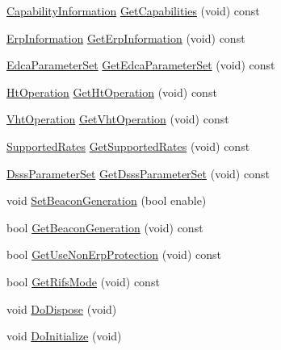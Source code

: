 \begin{DoxyCompactItemize}
\item 
\hyperlink{classns3_1_1CapabilityInformation}{Capability\+Information} \hyperlink{classns3_1_1ApWifiMac_a5794cfc6ec6c72f335b36f302a83178a}{Get\+Capabilities} (void) const 
\item 
\hyperlink{classns3_1_1ErpInformation}{Erp\+Information} \hyperlink{classns3_1_1ApWifiMac_ae88a116a1cdc0895105765b2c27e2f1a}{Get\+Erp\+Information} (void) const 
\item 
\hyperlink{classns3_1_1EdcaParameterSet}{Edca\+Parameter\+Set} \hyperlink{classns3_1_1ApWifiMac_a6b29faae7352877a1aa97a2146725ff5}{Get\+Edca\+Parameter\+Set} (void) const 
\item 
\hyperlink{classns3_1_1HtOperation}{Ht\+Operation} \hyperlink{classns3_1_1ApWifiMac_ae67f8b753332b379d189007ffee40733}{Get\+Ht\+Operation} (void) const 
\item 
\hyperlink{classns3_1_1VhtOperation}{Vht\+Operation} \hyperlink{classns3_1_1ApWifiMac_afde045b9f011d312e3110bb5b9411403}{Get\+Vht\+Operation} (void) const 
\item 
\hyperlink{classns3_1_1SupportedRates}{Supported\+Rates} \hyperlink{classns3_1_1ApWifiMac_a3d1278fa6624859d50b4ed984125de30}{Get\+Supported\+Rates} (void) const 
\item 
\hyperlink{classns3_1_1DsssParameterSet}{Dsss\+Parameter\+Set} \hyperlink{classns3_1_1ApWifiMac_a577723413f2a747d71ed01d8646ccc79}{Get\+Dsss\+Parameter\+Set} (void) const 
\item 
void \hyperlink{classns3_1_1ApWifiMac_a09ad3b96835cb8fac18783423d3e57a7}{Set\+Beacon\+Generation} (bool enable)
\item 
bool \hyperlink{classns3_1_1ApWifiMac_af6c5a1906e2bb39a655f92738efb9256}{Get\+Beacon\+Generation} (void) const 
\item 
bool \hyperlink{classns3_1_1ApWifiMac_a62eda2e1029d7922c4ed5bb5b0925d13}{Get\+Use\+Non\+Erp\+Protection} (void) const 
\item 
bool \hyperlink{classns3_1_1ApWifiMac_adafdc3775cb9facdd312947c854bbd81}{Get\+Rifs\+Mode} (void) const 
\item 
void \hyperlink{classns3_1_1ApWifiMac_a6a889756f44c64698ddeac55437a1e0f}{Do\+Dispose} (void)
\item 
void \hyperlink{classns3_1_1ApWifiMac_a398b0e04d5c31b7459358a459beff098}{Do\+Initialize} (void)
\end{DoxyCompactItemize}
